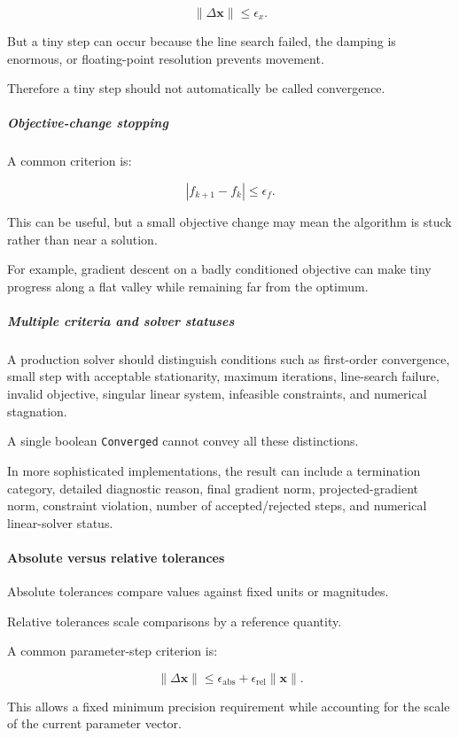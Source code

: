 \[
\|\Delta\mathbf x\| \le \epsilon_x.
\]

But a tiny step can occur because the line search failed, the damping is enormous, or floating-point resolution prevents movement.

Therefore a tiny step should not automatically be called convergence.

\subparagraph{Objective-change stopping}\label{objective-change-stopping}

A common criterion is:

\[
|f_{k+1}-f_k|\le\epsilon_f.
\]

This can be useful, but a small objective change may mean the algorithm is stuck rather than near a solution.

For example, gradient descent on a badly conditioned objective can make tiny progress along a flat valley while remaining far from the optimum.

\subparagraph{Multiple criteria and solver statuses}\label{multiple-criteria-and-solver-statuses}

A production solver should distinguish conditions such as first-order convergence, small step with acceptable stationarity, maximum iterations, line-search failure, invalid objective, singular linear system, infeasible constraints, and numerical stagnation.

A single boolean \texttt{Converged} cannot convey all these distinctions.

In more sophisticated implementations, the result can include a termination category, detailed diagnostic reason, final gradient norm, projected-gradient norm, constraint violation, number of accepted/rejected steps, and numerical linear-solver status.

\paragraph{Absolute versus relative tolerances}\label{absolute-versus-relative-tolerances}

Absolute tolerances compare values against fixed units or magnitudes.

Relative tolerances scale comparisons by a reference quantity.

A common parameter-step criterion is:

\[
\boxed{ \|\Delta\mathbf x\| \le \epsilon_{\mathrm{abs}}+ \epsilon_{\mathrm{rel}}\|\mathbf x\| }.
\]

This allows a fixed minimum precision requirement while accounting for the scale of the current parameter vector.

